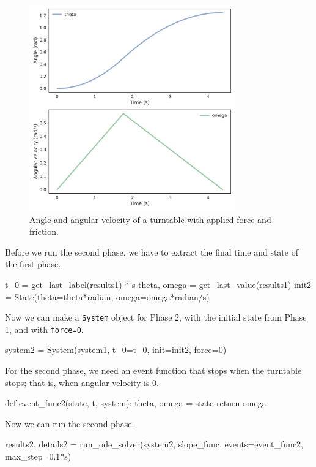 \documentclass[12pt]{book}
\theoremstyle{exercise}
\begin{document}
\begin{figure}
\centerline{\includegraphics[height=3.5in]{figs/chap25-fig01.pdf}}
\caption{Angle and angular velocity of a turntable with applied force and friction.}
\label{chap25-fig01}
\end{figure}

Before we run the second phase, we have to extract the final time and
state of the first phase.

\begin{python}
t_0 = get_last_label(results1) * s
theta, omega = get_last_value(results1)
init2 = State(theta=theta*radian, omega=omega*radian/s)
\end{python}

Now we can make a \texttt{System} object for Phase 2, with the initial state from Phase 1, and with \texttt{force=0}.

\begin{python}
system2 = System(system1, t_0=t_0, init=init2, force=0)
\end{python}

For the second phase, we need an event function that stops when the turntable stops; that is, when angular velocity is 0.

\begin{python}
def event_func2(state, t, system):
    theta, omega = state
    return omega
\end{python}

Now we can run the second phase.

\begin{python}
results2, details2 = run_ode_solver(system2, slope_func,
                         events=event_func2, max_step=0.1*s)
\end{python}
\end{document}
